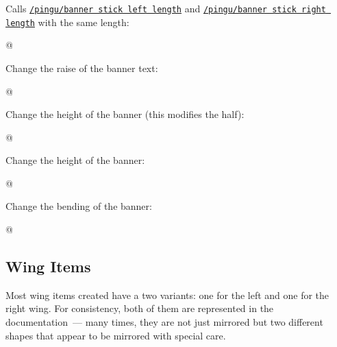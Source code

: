 \documentclass[parskip=half,english,numbers=noenddot,footnotes=nomultiple,oneside]{scrartcl}
\def\lpingu#1{\lstinline[style=lstpingu,language=pingulang]'#1'}
\newcommand*\keyref[2][/pingu/]{\hyperref[pk:#1#2]{\lpingu{#1#2}}}
\begin{document}
Calls \keyref{banner stick left length} and \keyref{banner stick right length} with the same length:
\begin{tcblisting}{@}
\begin{tikzpicture}
	\pingu[banner, banner sticks length=9mm]
\end{tikzpicture}
\end{tcblisting}
\endsubkeyexplain

Change the raise of the banner text:
\begin{tcblisting}{@}
\begin{tikzpicture}
	\pingu[banner, banner raise=2mm]
\end{tikzpicture}
\end{tcblisting}
\endsubkeyexplain

Change the height of the banner (this modifies the half):
\begin{tcblisting}{@}
\begin{tikzpicture}
	\pingu[banner, banner height=6mm]
\end{tikzpicture}
\end{tcblisting}
\endsubkeyexplain

Change the height of the banner:
\begin{tcblisting}{@}
\begin{tikzpicture}
	\pingu[banner, banner font=\itshape]
\end{tikzpicture}
\end{tcblisting}
\endsubkeyexplain

Change the bending of the banner:
\begin{tcblisting}{@}
\begin{tikzpicture}
	\pingu[banner, banner bent=0]
\end{tikzpicture}
\end{tcblisting}
\endsubkeyexplain

\subsection{Wing Items}
\label{sub:wing-items}Most wing items created have a two variants: one for the left and one for the right wing. For consistency, both of them are represented in the documentation~--- many times, they are not just mirrored but two different shapes that appear to be mirrored with special care.
\end{document}
